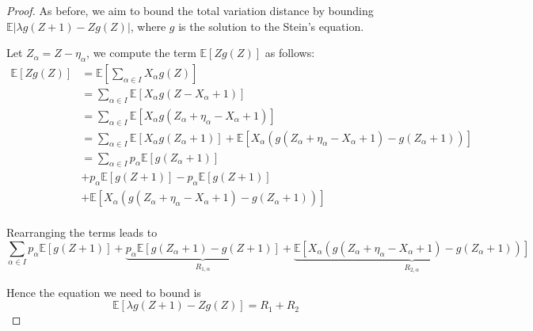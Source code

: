 \documentclass{article}
\begin{document}
\begin{proof}

    As before, we aim to bound the total variation distance by bounding $\mathbb{E}|\lambda g(Z+1) - Zg(Z)|$, where $g$ is the solution to the Stein's equation.  

    Let $Z_\alpha = Z - \eta_\alpha$, we compute the term $\mathbb{E}[Zg(Z)]$ as follows:  
    \begin{align*}
        \mathbb{E}[Zg(Z)] &= \mathbb{E}[\sum_{\alpha \in I} X_\alpha g(Z)]\\
        &= \sum_{\alpha \in I} \mathbb{E}[X_\alpha g(Z - X_\alpha + 1)]\\
        &= \sum_{\alpha \in I} \mathbb{E}[X_\alpha g(Z_\alpha + \eta_\alpha -X_\alpha +  1)]\\
        &= \sum_{\alpha \in I} \mathbb{E}[X_\alpha g(Z_\alpha + 1)] + \mathbb{E}[X_\alpha (g(Z_\alpha + \eta_\alpha -X_\alpha +  1) - g(Z_\alpha + 1))]\\
        &= \sum_{\alpha \in I} p_\alpha \mathbb{E}[g(Z_\alpha + 1)] \\
        &+ p_\alpha \mathbb{E}[g(Z+1)] - p_\alpha \mathbb{E}[g(Z+1)] \\
        &+ \mathbb{E}[X_\alpha (g(Z_\alpha + \eta_\alpha -X_\alpha +  1) - g(Z_\alpha + 1))] \\
    \end{align*}

Rearranging the terms leads to 
    \[\sum_{\alpha \in I} p_\alpha \mathbb{E}[g(Z + 1)] + \underbrace{p_\alpha \mathbb{E}[g(Z_\alpha+1) - g(Z+1)]}_{R_{1,\alpha}} + \underbrace{\mathbb{E}[X_\alpha (g(Z_\alpha + \eta_\alpha -X_\alpha +  1) - g(Z_\alpha + 1))]}_{R_{2, \alpha}}\] 

    Hence the equation we need to bound is
    \begin{equation*}
        \mathbb{E}[\lambda g(Z+1) - Zg(Z)] =  R_1 + R_2
    \end{equation*}


\end{proof}
\end{document}
